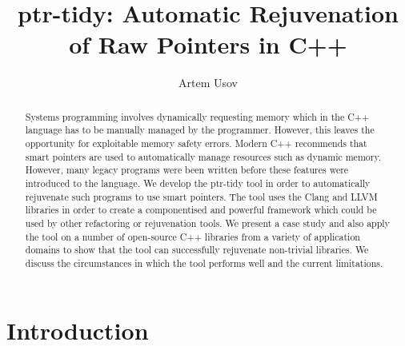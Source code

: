 \documentclass{mpaper}
\begin{document}
    \title{ptr-tidy: Automatic Rejuvenation of Raw Pointers in C++}
    \author{Artem Usov}

    \maketitle




    \begin{abstract}
    Systems programming involves dynamically requesting memory which in the C++ language has to be manually managed by the programmer. 
    However, this leaves the opportunity for exploitable memory safety errors.
    Modern C++ recommends that smart pointers are used to automatically manage resources such as dynamic memory.
    However, many legacy programs were been written before these features were introduced to the language.
    We develop the ptr-tidy tool in order to automatically rejuvenate such programs to use smart pointers.
    The tool uses the Clang and LLVM libraries in order to create a componentised and powerful framework which could be used by other refactoring or rejuvenation tools. 
    We present a case study and also apply the tool on a number of open-source C++ libraries from a variety of application domains to show that the tool can successfully rejuvenate non-trivial libraries.
    We discuss the circumstances in which the tool performs well and the current limitations.
    \end{abstract}




    \section{Introduction}\label{sec:introduction}
    
\end{document}
